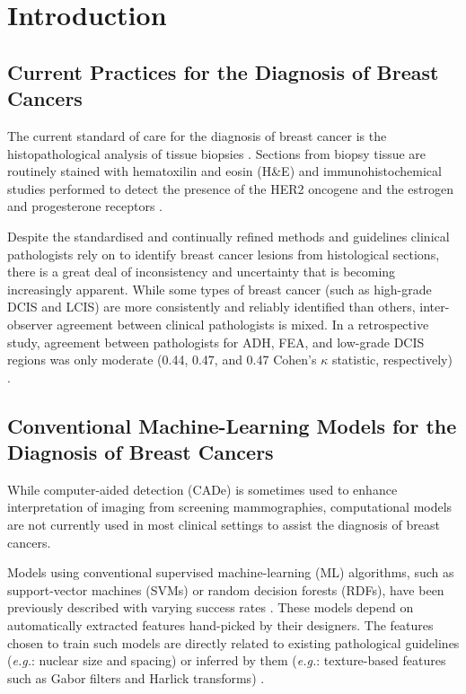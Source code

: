 \section{Introduction}

\subsection{Current Practices for the Diagnosis of Breast Cancers}

The current standard of care for the diagnosis of breast cancer is the histopathological analysis of tissue biopsies \citep{nccn}. Sections from biopsy tissue are routinely stained with hematoxilin and eosin (H\&E) and immunohistochemical studies performed to detect the presence of the HER2 oncogene and the estrogen and progesterone receptors \citep{who_intro}.\par

Despite the standardised and continually refined methods and guidelines clinical pathologists rely on to identify breast cancer lesions from histological sections, there is a great deal of inconsistency and uncertainty that is becoming increasingly apparent. While some types of breast cancer (such as high-grade DCIS and LCIS) are more consistently and reliably identified than others, inter-observer agreement between clinical pathologists is mixed. In a retrospective study, agreement between pathologists for ADH, FEA, and low-grade DCIS regions was only moderate (0.44, 0.47, and 0.47 Cohen's $\kappa$ statistic, respectively) \citep{gomes2014}.\par

\subsection{Conventional Machine-Learning Models for the Diagnosis of Breast Cancers}

While computer-aided detection (CADe) is sometimes used to enhance interpretation of imaging from screening mammographies, computational models are not currently used in most clinical settings to assist the diagnosis of breast cancers.\par

Models using conventional supervised machine-learning (ML) algorithms, such as support-vector machines (SVMs) or random decision forests (RDFs), have been previously described with varying success rates \citep{anuranjeeta2017, gertych2015}. These models depend on automatically extracted features hand-picked by their designers. The features chosen to train such models are directly related to existing pathological guidelines (\emph{e.g.}: nuclear size and spacing) or inferred by them (\emph{e.g.}: texture-based features such as Gabor filters and Harlick transforms) \citep{anuranjeeta2017, doyle2008}.\par


